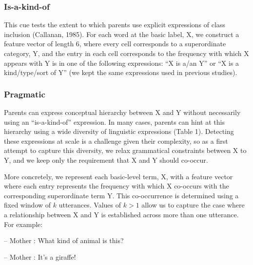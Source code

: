 \documentclass[english,,man,floatsintext]{apa6}
\begin{document}
\hypertarget{is-a-kind-of}{%
\subsubsection{Is-a-kind-of}\label{is-a-kind-of}}

This cue tests the extent to which parents use explicit expressions of class inclusion (Callanan, 1985). For each word at the basic label, X,
we construct a feature vector of length 6, where every cell corresponds to a superordinate category, Y, and the entry in each cell corresponds to the frequency with which X appears with Y is in one of the following expressions: \enquote{X is a/an Y} or \enquote{X is a kind/type/sort of Y} (we kept the same expressions used in previous studies).

\hypertarget{pragmatic}{%
\subsubsection{Pragmatic}\label{pragmatic}}

Parents can express conceptual hierarchy between X and Y without
necessarily using an \enquote{is-a-kind-of} expression. In many cases, parents
can hint at this hierarchy using a wide diversity of
linguistic expressions (Table 1). Detecting these expressions at scale is a challenge given their complexity, so as a first attempt to capture this diversity, we relax
grammatical constraints between X to Y, and we keep only the requirement
that X and Y should co-occur.

More concretely, we represent each basic-level term, X, with a feature
vector where each entry represents the frequency with which X co-occurs
with the corresponding superordinate term Y. This co-occurrence is
determined using a fixed window of \(k\) utterances. Values of \(k > 1\)
allow us to capture the case where a relationship between X and Y is
established across more than one utterance. For example:

-- Mother : What kind of animal is this?

-- Mother : It's a giraffe!
\end{document}
